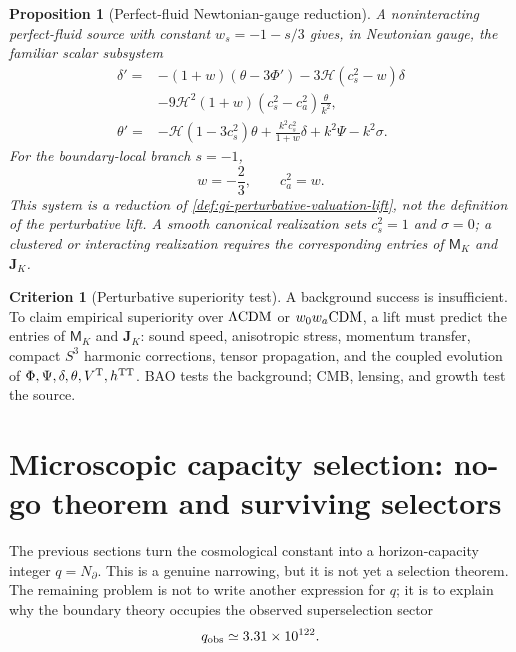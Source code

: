 \documentclass[aps,prd,reprint,nofootinbib,superscriptaddress,floatfix]{revtex4-2}
\numberwithin{equation}{section}
\theoremstyle{definition}
\newtheorem{criterion}{Criterion}[section]
\theoremstyle{plain}
\newtheorem{proposition}{Proposition}[section]
\newcommand{\Ncap}{N_{\partial}}
\begin{document}
\begin{proposition}[Perfect-fluid Newtonian-gauge reduction]
\label{prop:perfect-fluid-reduction}
A noninteracting perfect-fluid source with constant
\(w_s=-1-s/3\) gives, in Newtonian gauge, the familiar scalar subsystem
\cite{MaBertschinger1995}
\begin{align}
\delta'={}&-(1+w)(\theta-3\Phi')
-3\mathcal H(c_s^2-w)\delta
\nonumber\\
&-9\mathcal H^2(1+w)(c_s^2-c_a^2)\frac{\theta}{k^2},
\\
\theta'={}&-\mathcal H(1-3c_s^2)\theta
+\frac{k^2c_s^2}{1+w}\delta
+k^2\Psi-k^2\sigma .
\end{align}
For the boundary-local branch \(s=-1\),
\begin{equation}
\boxed{
w=-\frac23,\qquad c_a^2=w .
}
\end{equation}
This system is a reduction of \cref{def:gi-perturbative-valuation-lift}, not
the definition of the perturbative lift.  A smooth canonical realization sets
\(c_s^2=1\) and \(\sigma=0\); a clustered or interacting realization requires
the corresponding entries of \(\mathsf M_K\) and \(\mathbf J_K\).
\end{proposition}

\begin{criterion}[Perturbative superiority test]
A background success is insufficient.  To claim empirical superiority over
\(\Lambda{\rm CDM}\) or \(w_0w_a{\rm CDM}\), a lift must predict the entries of
\(\mathsf M_K\) and \(\mathbf J_K\): sound speed, anisotropic stress, momentum
transfer, compact \(S^3\) harmonic corrections, tensor propagation, and the
coupled evolution of \(\Phi,\Psi,\delta,\theta,V^{\rm T},h^{\rm TT}\).  BAO
tests the background; CMB, lensing, and growth test the source.
\end{criterion}



\section{Microscopic capacity selection: no-go theorem and surviving selectors}
\label{sec:capacity-selection}

The previous sections turn the cosmological constant into a horizon-capacity integer \(q=\Ncap\).  This is a genuine narrowing, but it is not yet a selection theorem.  The remaining problem is not to write another expression for \(q\); it is to explain why the boundary theory occupies the observed superselection sector
\[
q_{\rm obs}\simeq 3.31\times 10^{122}.
\]
\end{document}
